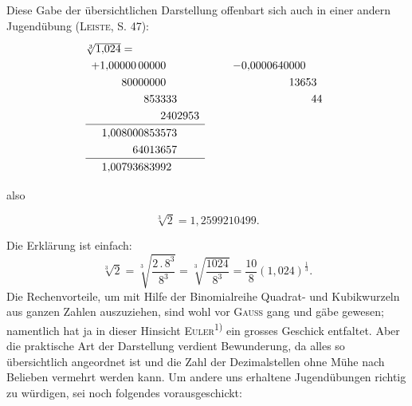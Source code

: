 Diese Gabe der übersichtlichen Darstellung offenbart sich auch in einer
andern Jugendübung (\textsc{Leiste}, S. 47):
\[
\renewcommand{\arraystretch}{1.25}
\begin{array}{l@{\qquad}l}
\sqrt[3]{1{,}024}= &\\
\begin{array}[t]{r}
+1{,}00000\,00000\phantom{000000}\\
80000000\phantom{000000}\\
853333\phantom{0000}\\
2402953\\\hline
1{,}008000853573\phantom{0000}\\
64013657\phantom{0000}\\\hline
1{,}00793683992\phantom{00000}
\end{array}
&\begin{array}[t]{r}
-0{,}0000640000\phantom{000}\\
13653\phantom{0}\\
44
\end{array}
\end{array}
\]
\begin{center}also\end{center}
\[
\sqrt[3]{2}=1{,}2599210499.
\]
\par\noindent\hspace*{\parindent}Die Erklärung ist einfach:
\[
\sqrt[3]{2}=\sqrt[3]{\frac{2\mathpunct{.}8^3}{8^3}}
=\sqrt[3]{\frac{1024}{8^3}}=\frac{10}{8}(1{,}024)^{\frac{1}{3}}.
\]
\noindent Die Rechenvorteile, um mit Hilfe der Binomialreihe Quadrat- und Kubikwurzeln aus ganzen Zahlen auszuziehen, sind wohl vor \textsc{Gauss} gang und gäbe
gewesen; namentlich hat ja in dieser Hinsicht \textsc{Euler}\textsuperscript{1)} ein grosses Geschick
entfaltet. Aber die praktische Art der Darstellung verdient Bewunderung, da
alles so übersichtlich angeordnet ist und die Zahl der Dezimalstellen ohne
Mühe nach Belieben vermehrt werden kann.
\setcounter{footnote}{2}
\clearpage{}
\setcounter{footnote}{0}
\noindent\hspace*{\parindent}Um andere uns erhaltene Jugendübungen richtig zu würdigen, sei noch
folgendes vorausgeschickt:

